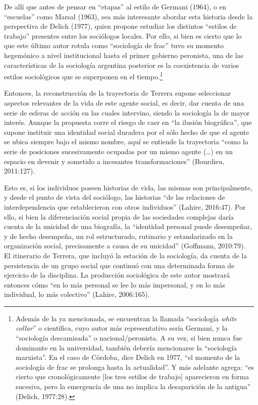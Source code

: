 De allí que antes de pensar en ``etapas'' al estilo de Germani (1964), o en ``escuelas'' como Marsal (1963), sea más interesante abordar esta historia desde la perspectiva de Delich (1977), quien propone estudiar los distintos ``estilos de trabajo'' presentes entre los sociólogos locales. Por ello, si bien es cierto que lo que este último autor rotula como ``sociología de frac'' tuvo su momento hegemónico a nivel institucional hasta el primer gobierno peronista, una de las características de la sociología argentina posterior es la coexistencia de varios estilos sociológicos que se superponen en el tiempo.\footnote{Además de la ya mencionada, se encuentran la llamada ``sociología \emph{white collar}'' o científica, cuyo autor más representativo sería Germani, y la ``sociología descamisada'' o nacional/peronista. A su vez, si bien nunca fue dominante en la universidad, también debería mencionarse la ``sociología marxista''. En el caso de Córdoba, dice Delich en 1977, ``el momento de la sociología de frac se prolonga hasta la actualidad''. Y más adelante agrega: ``es cierto que cronológicamente {[}los tres estilos de trabajo{]} aparecieron en forma sucesiva, pero la emergencia de una no implica la desaparición de la antigua'' (Delich, 1977:28).}

Entonces, la reconstrucción de la trayectoria de Terrera supone seleccionar aspectos relevantes de la vida de este agente social, es decir, dar cuenta de una serie de esferas de acción en las cuales intervino, siendo la sociología la de mayor interés. Aunque la propuesta corre el riesgo de caer en ``la ilusión biográfica'', que supone instituir una identidad social duradera por el sólo hecho de que el agente se ubica siempre bajo el mismo nombre, aquí se entiende la trayectoria ``como la serie de posiciones sucesivamente ocupadas por un mismo agente (\ldots) en un espacio en devenir y sometido a incesantes transformaciones'' (Bourdieu, 2011:127).

Esto es, si los individuos poseen historias de vida, las mismas son principalmente, y desde el punto de vista del sociólogo, las historias ``de las relaciones de interdependencia que establecieron con otros individuos'' (Lahire, 2016:47). Por ello, si bien la diferenciación social propia de las sociedades complejas daría cuenta de la unicidad de una biografía, la ``identidad personal puede desempeñar, y de hecho desempeña, un rol estructurado, rutinario y estandarizado en la organización social, precisamente a causa de su unicidad'' (Goffmann, 2010:79). El itinerario de Terrera, que incluyó la estación de la sociología, da cuenta de la persistencia de un grupo social que continuó con una determinada forma de ejercicio de la disciplina. La producción sociológica de este autor mostrará entonces cómo ``en lo más personal se lee lo más impersonal, y en lo más individual, lo más colectivo'' (Lahire, 2006:165).

